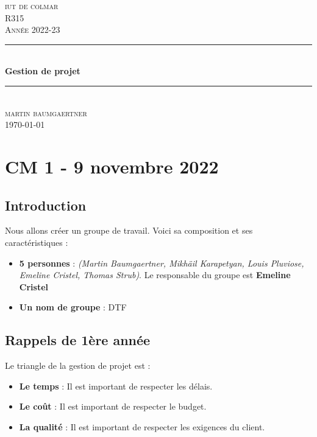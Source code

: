 \documentclass[12pt, a4paper]{article}
\begin{document}
\begin{titlepage}
	\newcommand{\HRule}{\rule{\linewidth}{0.5mm}} 
	\center 
	\textsc{\LARGE iut de colmar}\\[6.5cm] 
	\textsc{\Large R315}\\[0.5cm] 
	\textsc{\large Année 2022-23}\\[0.5cm]
	\HRule\\[0.75cm]
	{\huge\bfseries Gestion de projet}\\[0.4cm]
	\HRule\\[1.5cm]
	\textsc{\large martin baumgaertner}\\[6.5cm] 

	\vfill\vfill\vfill
	{\large\today} 
	\vfill
\end{titlepage}
\newpage
\tableofcontents
\newpage
\section{CM 1 - 9 novembre 2022}
\subsection{Introduction}
Nous allons créer un groupe de travail. Voici sa composition et ses caractéristiques :
\begin{itemize}
    \item \textbf{5 personnes} : \textit{(Martin Baumgaertner, Mikhäil Karapetyan, Louis Pluviose, Emeline Cristel, Thomas Strub)}. Le responsable du groupe est \textbf{Emeline Cristel} 
    \item \textbf{Un nom de groupe} : DTF\\
\end{itemize}

\subsection{Rappels de 1ère année}

Le triangle de la gestion de projet est : 
\begin{itemize}
    \item \textbf{Le temps} : Il est important de respecter les délais. 
    \item \textbf{Le coût} : Il est important de respecter le budget. 
    \item \textbf{La qualité} : Il est important de respecter les exigences du client.\\
\end{itemize}
\end{document}
